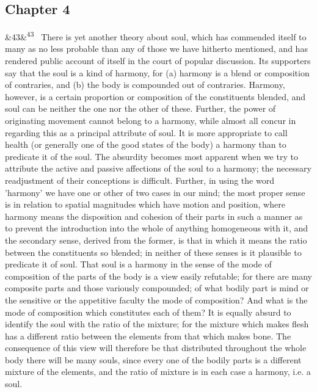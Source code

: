 \documentclass[12pt]{article}
\newcommand{\para}[1][]{\par\noindent\ifx&#1&\else\textsuperscript{\footnotesize #1}~\fi}
\begin{document}
\subsection*{Chapter 4}

\para[43] There is yet another theory about soul, which has commended itself to many as no less probable than any of those we have hitherto mentioned, and has rendered public account of itself in the court of popular discussion. Its supporters say that the soul is a kind of harmony, for (a) harmony is a blend or composition of contraries, and (b) the body is compounded out of contraries. Harmony, however, is a certain proportion or composition of the constituents blended, and soul can be neither the one nor the other of these. Further, the power of originating movement cannot belong to a harmony, while almost all concur in regarding this as a principal attribute of soul. It is more appropriate to call health (or generally one of the good states of the body) a harmony than to predicate it of the soul. The absurdity becomes most apparent when we try to attribute the active and passive affections of the soul to a harmony; the necessary readjustment of their conceptions is difficult. Further, in using the word 'harmony' we have one or other of two cases in our mind; the most proper sense is in relation to spatial magnitudes which have motion and position, where harmony means the disposition and cohesion of their parts in such a manner as to prevent the introduction into the whole of anything homogeneous with it, and the secondary sense, derived from the former, is that in which it means the ratio between the constituents so blended; in neither of these senses is it plausible to predicate it of soul. That soul is a harmony in the sense of the mode of composition of the parts of the body is a view easily refutable; for there are many composite parts and those variously compounded; of what bodily part is mind or the sensitive or the appetitive faculty the mode of composition? And what is the mode of composition which constitutes each of them? It is equally absurd to identify the soul with the ratio of the mixture; for the mixture which makes flesh has a different ratio between the elements from that which makes bone. The consequence of this view will therefore be that distributed throughout the whole body there will be many souls, since every one of the bodily parts is a different mixture of the elements, and the ratio of mixture is in each case a harmony, i.e. a soul.
\end{document}
